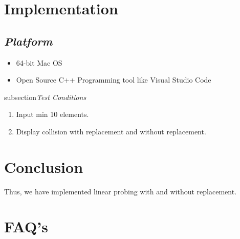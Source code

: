 \documentclass{article}
\begin{document}
\section{\textbf{Implementation}}
\subsection{\textit{Platform}}
\begin{itemize}
	\item 64-bit Mac OS
	\item Open Source C++ Programming tool like Visual Studio Code
\end{itemize}
subsection{\textit{Test Conditions}}
\begin{enumerate}
    \item Input min 10 elements.
	\item Display collision with replacement and without replacement.
\end{enumerate}
\section{\textbf{Conclusion}}
Thus, we have implemented linear probing with and without replacement.
\section{\textbf{FAQ's}}
\end{document}
